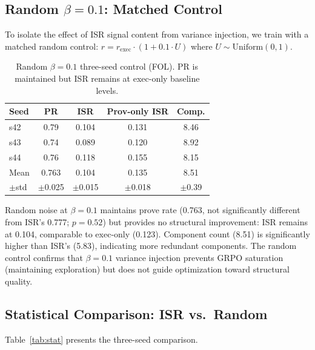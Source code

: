 \documentclass[11pt,twocolumn]{article}
\newcommand{\isr}{\textsc{ISR}}
\newcommand{\pr}{\textsc{PR}}
\newcommand{\grpo}{\textsc{GRPO}}
\begin{document}
\subsection{Random $\beta{=}0.1$: Matched Control}

To isolate the effect of ISR signal content from variance injection, we train with a matched random control: $r = r_{\text{exec}} \cdot (1 + 0.1 \cdot U)$ where $U \sim \text{Uniform}(0,1)$.

\begin{table}[h]
\centering
\caption{Random $\beta{=}0.1$ three-seed control (FOL). PR is maintained but ISR remains at exec-only baseline levels.}
\label{tab:random_3seed}
\small
\begin{tabular}{@{}lcccc@{}}
\toprule
Seed & \pr{} & \isr{} & Prov-only \isr{} & Comp. \\
\midrule
s42 & 0.79 & 0.104 & 0.131 & 8.46 \\
s43 & 0.74 & 0.089 & 0.120 & 8.92 \\
s44 & 0.76 & 0.118 & 0.155 & 8.15 \\
\midrule
Mean & 0.763 & 0.104 & 0.135 & 8.51 \\
$\pm$std & $\pm$0.025 & $\pm$0.015 & $\pm$0.018 & $\pm$0.39 \\
\bottomrule
\end{tabular}
\end{table}

Random noise at $\beta{=}0.1$ maintains prove rate (0.763, not significantly different from ISR's 0.777; $p{=}0.52$) but provides no structural improvement: \isr{} remains at 0.104, comparable to exec-only (0.123).
Component count (8.51) is significantly higher than ISR's (5.83), indicating more redundant components.
The random control confirms that $\beta{=}0.1$ variance injection prevents \grpo{} saturation (maintaining exploration) but does not guide optimization toward structural quality.

\subsection{Statistical Comparison: ISR vs.\ Random}

Table~\ref{tab:stat} presents the three-seed comparison.
\end{document}
